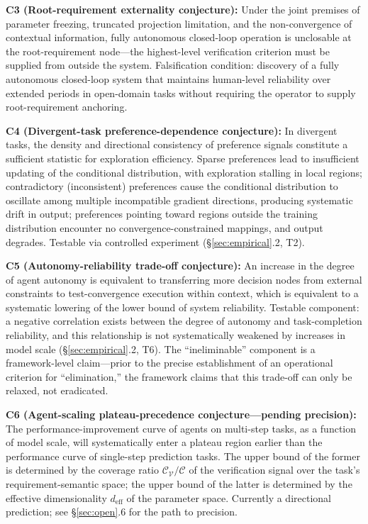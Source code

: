 \documentclass[11pt,a4paper]{article}
\theoremstyle{definition}
\newcommand{\verifspace}{\mathcal{C}_{\mathcal{V}}}
\newcommand{\taskcspace}{\mathcal{C}}
\begin{document}
\textbf{C3 (Root-requirement externality conjecture):}
Under the joint premises of parameter freezing, truncated projection limitation, and the non-convergence of contextual information, fully autonomous closed-loop operation is unclosable at the root-requirement node---the highest-level verification criterion must be supplied from outside the system. Falsification condition: discovery of a fully autonomous closed-loop system that maintains human-level reliability over extended periods in open-domain tasks without requiring the operator to supply root-requirement anchoring.

\textbf{C4 (Divergent-task preference-dependence conjecture):}
In divergent tasks, the density and directional consistency of preference signals constitute a sufficient statistic for exploration efficiency. Sparse preferences lead to insufficient updating of the conditional distribution, with exploration stalling in local regions; contradictory (inconsistent) preferences cause the conditional distribution to oscillate among multiple incompatible gradient directions, producing systematic drift in output; preferences pointing toward regions outside the training distribution encounter no convergence-constrained mappings, and output degrades. Testable via controlled experiment (\S\ref{sec:empirical}.2, T2).

\textbf{C5 (Autonomy-reliability trade-off conjecture):}
An increase in the degree of agent autonomy is equivalent to transferring more decision nodes from external constraints to test-convergence execution within context, which is equivalent to a systematic lowering of the lower bound of system reliability. Testable component: a negative correlation exists between the degree of autonomy and task-completion reliability, and this relationship is not systematically weakened by increases in model scale (\S\ref{sec:empirical}.2, T6). The ``ineliminable'' component is a framework-level claim---prior to the precise establishment of an operational criterion for ``elimination,'' the framework claims that this trade-off can only be relaxed, not eradicated.

\textbf{C6 (Agent-scaling plateau-precedence conjecture---pending precision):}
The performance-improvement curve of agents on multi-step tasks, as a function of model scale, will systematically enter a plateau region earlier than the performance curve of single-step prediction tasks. The upper bound of the former is determined by the coverage ratio $\verifspace/\taskcspace$ of the verification signal over the task's requirement-semantic space; the upper bound of the latter is determined by the effective dimensionality $d_{\text{eff}}$ of the parameter space. Currently a directional prediction; see \S\ref{sec:open}.6 for the path to precision.
\end{document}
